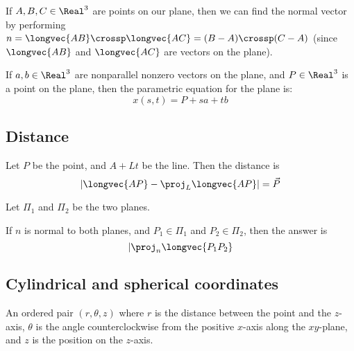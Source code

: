 \begin{procedure}
  If $A, B, C \in \Real^3$ are points on our plane, then we can find the normal vector by performing $n = \longvec{AB} \crossp \longvec{AC} = (B - A) \crossp (C - A)$ (since $\longvec{AB}$ and $\longvec{AC}$ are vectors on the plane).
\end{procedure}

\begin{theorem}
  If $a, b \in \Real^3$ are nonparallel nonzero vectors on the plane, and $P \in \Real^3$ is a point on the plane, then the parametric equation for the plane is:
  \[
    x(s, t) = P + sa + tb
  \]
\end{theorem}

\subsection{Distance}


\begin{procedure}
  Let $P$ be the point, and $A + Lt$ be the line. Then the distance is
  \[
    |\longvec{AP} - \proj_L \longvec{AP}| = \vec{P}
  \]
\end{procedure}

\begin{procedure}
  Let $\Pi_1$ and $\Pi_2$ be the two planes.

  If $n$ is normal to both planes, and $P_1 \in \Pi_1$ and $P_2 \in \Pi_2$, then the answer is
  \[
    |\proj_n \longvec{P_1 P_2}
  \]
\end{procedure}

\subsection{Cylindrical and spherical coordinates}


\begin{definition}
  An ordered pair $(r, \theta, z)$ where $r$ is the distance between the point and the $z$-axis, $\theta$ is the angle counterclockwise from the positive $x$-axis along the $xy$-plane, and $z$ is the position on the $z$-axis.
\end{definition}

